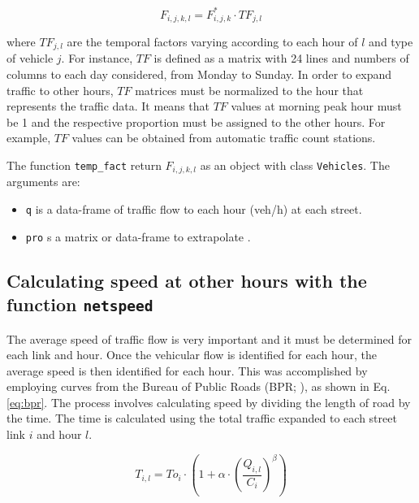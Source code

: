 \documentclass[12pt,graybox,envcountchap,sectrefs]{krantz}
\providecommand{\tightlist}{%
  \setlength{\itemsep}{0pt}\setlength{\parskip}{0pt}}
\theoremstyle{definition}
\theoremstyle{definition}
\theoremstyle{definition}
\theoremstyle{remark}
\begin{document}
\begin{equation}
F_{i,j,k,l} = F^*_{i,j,k} \cdot TF_{j,l}
\label{eq:flowx}
\end{equation}

where \(TF_{j,l}\) are the temporal factors varying according to each
hour of \(l\) and type of vehicle \(j\). For instance, \(TF\) is defined
as a matrix with 24 lines and numbers of columns to each day considered,
from Monday to Sunday. In order to expand traffic to other hours, \(TF\)
matrices must be normalized to the hour that represents the traffic
data. It means that \(TF\) values at morning peak hour must be 1 and the
respective proportion must be assigned to the other hours. For example,
\(TF\) values can be obtained from automatic traffic count stations.

The function \texttt{temp\_fact} return \(F_{i,j,k,l}\) as an object
with class \texttt{Vehicles}. The arguments are:

\begin{itemize}
\tightlist
\item
  \texttt{q} is a data-frame of traffic flow to each hour (veh/h) at
  each street.
\item
  \texttt{pro} s a matrix or data-frame to extrapolate .
\end{itemize}

\subsection{\texorpdfstring{Calculating speed at other hours with the
function
\texttt{netspeed}}{Calculating speed at other hours with the function netspeed}}\label{calculating-speed-at-other-hours-with-the-function-netspeed}

The average speed of traffic flow is very important and it must be
determined for each link and hour. Once the vehicular flow is identified
for each hour, the average speed is then identified for each hour. This
was accomplished by employing curves from the Bureau of Public Roads
(BPR; \citep{bpr}), as shown in Eq. \eqref{eq:bpr}. The process involves
calculating speed by dividing the length of road by the time. The time
is calculated using the total traffic expanded to each street link \(i\)
and hour \(l\).

\begin{equation}
T_{i,l} = To_i \cdot \left(1 +\alpha \cdot \left(\dfrac{Q_{i,l}}{C_i}\right)^\beta \right)
\label{eq:bpr}
\end{equation}
\end{document}
